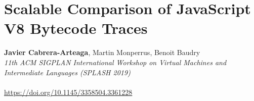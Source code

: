 %
    {} %
    {} %

    
\chapter{Scalable Comparison of JavaScript V8 Bytecode Traces}

\textbf{Javier Cabrera-Arteaga}, Martin Monperrus, Benoit Baudry\\
\emph{11th ACM SIGPLAN International Workshop on Virtual Machines and Intermediate Languages (SPLASH 2019)}\\\\
\url{https://doi.org/10.1145/3358504.3361228}\\


%
    {} %
    {} %
    